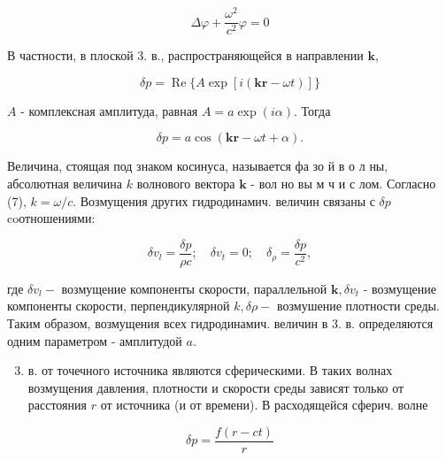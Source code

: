 \documentclass[10pt]{article}
\begin{document}
\[

\Delta \varphi+\frac{\omega^{2}}{c^{2}} \varphi=0

\]



В частности, в плоской 3. в., распространяющейся в направлении $\boldsymbol{k}$,



\[

\delta p=\operatorname{Re}\{A \exp [i(\boldsymbol{k r}-\omega t)]\}

\]



$A$ - комплексная амплитуда, равная $A=a \exp (i \alpha)$. Тогда



\[

\delta p=a \cos (\boldsymbol{k r}-\omega t+\alpha) .

\]



Величина, стоящая под знаком косинуса, называется фа зо й в о л ны, абсолютная величина $k$ волнового вектора $\boldsymbol{k}$ - вол но вы м ч и с лом. Согласно (7), $k=\omega / c$. Возмущения других гидродинамич. величин связаны с $\delta p$ coотношениями:



\[

\delta v_{l}=\frac{\delta p}{\rho c} ; \quad \delta v_{t}=0 ; \quad \delta_{\rho}=\frac{\delta p}{c^{2}},

\]



где $\delta v_{l}-$ возмущение компоненты скорости, параллельной $\boldsymbol{k}, \delta v_{t}$ - возмущение компоненты скорости, перпендикулярной $k, \delta \rho-$ возмушение плотности среды. Таким образом, возмущения всех гидродинамич. величин в 3. в. определяются одним параметром - амплитудой $a$.



\begin{enumerate}

  \setcounter{enumi}{2}

  \item в. от точечного источника являются сферическими. В таких волнах возмущения давления, плотности и скорости среды зависят только от расстояния $r$ от источника (и от времени). В расходящейся сферич. волне

\end{enumerate}



\[

\delta p=\frac{f(r-c t)}{r}

\]
\end{document}
